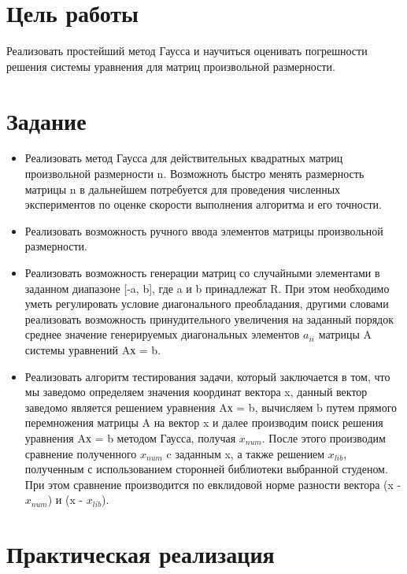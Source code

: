 \documentclass[a4paper, 14pt]{extarticle}
\begin{document}
\renewcommand{\ttdefault}{pcr}

\setlength{\tabcolsep}{3pt}
\newpage
\setcounter{page}{2}

\section{Цель работы}\label{Sect::goal}

Реализовать простейший метод Гаусса и научиться оценивать погрешности решения
системы уравнения для матриц произвольной размерности.

\section{Задание}\label{Sect::task}

\begin{itemize}
    \item Реализовать метод Гаусса для действительных квадратных матриц произвольной размерности n. Возможноть быстро менять размерность матрицы n в дальнейшем потребуется для проведения численных экспериментов по оценке скорости выполнения алгоритма и его точности.
    \item Реализовать возможность ручного ввода элементов матрицы произвольной размерности.
    \item Реализовать возможность генерации матриц со случайными элементами в заданном диапазоне [-a, b], где a и b принадлежат R. При этом необходимо уметь регулировать условие диагонального преобладания, другими словами реализовать возможность принудительного увеличения на заданный порядок среднее значение генерируемых диагональных элементов $a_{ii}$ матрицы A системы уравнений Aх = b.
    \item Реализовать алгоритм тестирования задачи, который заключается в том, что мы заведомо определяем значения координат вектора x, данный вектор заведомо является решением уравнения Aх = b, вычисляем b путем прямого перемножения матрицы A на вектор x и далее производим поиск решения уравнения Aх = b методом Гаусса, получая $x_{num}$. После этого производим сравнение полученного $x_{num}$ c заданным x, а также решением $x_{lib}$, полученным с использованием сторонней библиотеки выбранной студеном. При этом сравнение производится по евклидовой норме разности вектора (x - $x_{num}$) и (x - $x_{lib}$).
\end{itemize}

\section{Практическая реализация}\label{Sect::code}
\end{document}
